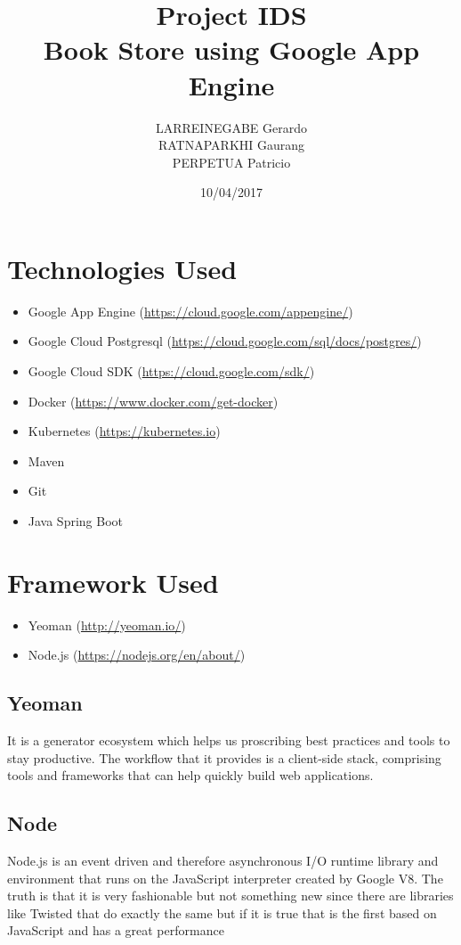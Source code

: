 \documentclass[a4paper]{article}
\title{Project IDS \\
Book Store using Google App Engine}
\author{LARREINEGABE Gerardo \\
RATNAPARKHI Gaurang \\
PERPETUA Patricio}
\date{10/04/2017}
\begin{document}
\maketitle


\section{Technologies Used}
\begin{itemize}
    
    \item Google App Engine (\url{https://cloud.google.com/appengine/})
    \item Google Cloud Postgresql (\url{https://cloud.google.com/sql/docs/postgres/})
    \item Google Cloud SDK (\url{https://cloud.google.com/sdk/})
    \item Docker (\url{https://www.docker.com/get-docker})
    \item Kubernetes (\url{https://kubernetes.io})
    \item Maven 
    \item Git
    \item Java Spring Boot
\end{itemize}

\section{Framework Used}
\begin{itemize}
    \item Yeoman (\url{http://yeoman.io/})
    \item Node.js (\url{https://nodejs.org/en/about/})
\end{itemize}
\subsection{Yeoman}
It is a generator ecosystem which helps us proscribing best practices and tools to stay productive.
The workflow that it provides is a client-side stack, comprising tools and frameworks that can help quickly build web applications.
\subsection{Node}
Node.js is an event driven and therefore asynchronous I/O runtime library and environment that runs on the JavaScript interpreter created by Google V8. The truth is that it is very fashionable but not something new since there are libraries like Twisted that do exactly the same but if it is true that is the first based on JavaScript and has a great performance
\end{document}

